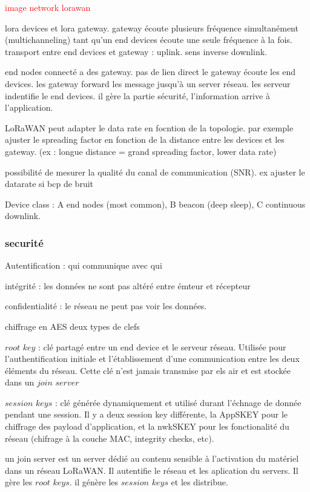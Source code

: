 \textcolor{red}{image network lorawan}

lora devices et lora gateway. gateway écoute plusieurs fréquence simultanément (multichanneling) tant qu'un end devices écoute une seule fréquence à la fois. transport entre end devices et gateway : uplink. sens inverse downlink.


end nodes connecté a des gateway. pas de lien direct le gateway écoute les end devices. les gateway forward les message jusqu'à un server réseau. les serveur indentifie le end devices. il gère la partie sécurité, l'information arrive à l'application.

LoRaWAN peut adapter le data rate en focntion de la topologie. par exemple ajuster le spreading factor en fonction de la distance entre les devices et les gateway. (ex : longue distance = grand spreading factor, lower data rate)

possibilité de mesurer la qualité du canal de communication (SNR). ex ajuster le datarate si bcp de bruit

Device class :
A end nodes (most common), 
B beacon (deep sleep),
C continuous downlink.

\subsubsection{securité}

Autentification : qui communique avec qui

intégrité : les données ne sont pas altéré entre émteur et récepteur

confidentialité : le réseau ne peut pas voir les données.

chiffrage en AES
deux types de clefs

$root$ $key$ : clé partagé entre un end device et le serveur réseau. Utilisée pour l'authentification initiale et l'établissement d'une communication entre les deux éléments du réseau. Cette clé n'est jamais transmise par els air et est stockée dans un $join$ $server$

$session$ $keys$ : clé générée dynamiquement et utilisé durant l'échnage de donnée pendant une session. Il y a deux session key différente, la AppSKEY pour le chiffrage des payload d'application, et la nwkSKEY pour les fonctionalité du réseau (chifrage à la couche MAC, integrity checks, etc).

un join server est un server dédié au contenu sensible à l'activation du matériel dans un réseau LoRaWAN. Il autentifie le réseau et les aplication du servers. Il gère les $root$ $keys$. il génère les $session$ $keys$ et les distribue.

